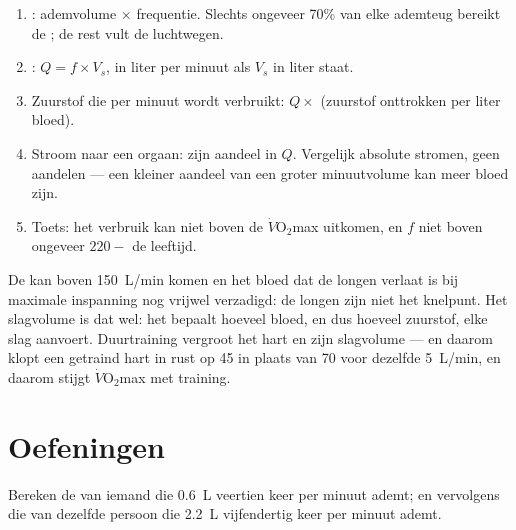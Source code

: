 \begin{method}\label{met:g10:heart-lungs-effort:compute}
\begin{enumerate}
  \item {}: ademvolume $\times$ frequentie. Slechts ongeveer 70\%
        van elke ademteug bereikt de ; de rest vult de
        luchtwegen.
  \item {}: $Q = f \times V_s$, in liter per minuut als
        $V_s$ in liter staat.
  \item Zuurstof die per minuut wordt verbruikt: $Q \times$ (zuurstof
        onttrokken per liter bloed).
  \item Stroom naar een orgaan: zijn aandeel in $Q$. Vergelijk absolute
        stromen, geen aandelen --- een kleiner aandeel van een groter
        minuutvolume kan meer bloed zijn.
  \item Toets: het verbruik kan niet boven de $\dot V\!\mathrm{O_2}$max
        uitkomen, en $f$ niet boven ongeveer $220 - $ de leeftijd.
\end{enumerate}
\end{method}

\begin{remark}\label{rem:g10:heart-lungs-effort:limit}
De  kan boven \qty{150}{L/min} komen en het bloed dat de longen
verlaat is bij maximale inspanning nog vrijwel verzadigd: de longen zijn
niet het knelpunt. Het slagvolume is dat wel: het bepaalt hoeveel bloed,
en dus hoeveel zuurstof, elke slag aanvoert. Duurtraining vergroot het
hart en zijn slagvolume --- en daarom klopt een getraind hart in rust op
45 in plaats van 70 voor dezelfde \qty{5}{L/min}, en daarom stijgt
$\dot V\!\mathrm{O_2}$max met training.
\end{remark}

\section{Oefeningen}

\begin{exercise}[$\star$]\label{exo:g10:heart-lungs-effort:1}
Bereken de  van iemand die \qty{0.6}{L} veertien keer per
minuut ademt; en vervolgens die van dezelfde persoon die \qty{2.2}{L}
vijfendertig keer per minuut ademt.
\end{exercise}

